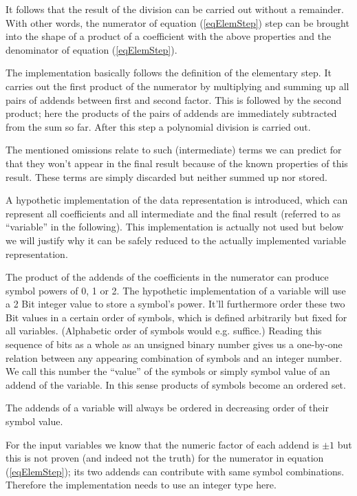 It follows that the result of the division can be carried out without a
remainder. With other words, the numerator of equation (\ref{eqElemStep})
step can be brought into the shape of a product of a coefficient with the
above properties and the denominator of equation (\ref{eqElemStep}).

The implementation basically follows the definition of the elementary
step. It carries out the first product of the numerator by multiplying and
summing up all pairs of addends between first and second factor. This is
followed by the second product; here the products of the pairs of addends
are immediately subtracted from the sum so far. After this step a
polynomial division is carried out.

The mentioned omissions relate to such (intermediate) terms we can predict
for that they won't appear in the final result because of the known
properties of this result. These terms are simply discarded but neither
summed up nor stored.

A hypothetic implementation of the data representation is introduced,
which can represent all coefficients and all intermediate and the final
result (referred to as ``variable'' in the following). This implementation
is actually not used but below we will justify why it can be safely
reduced to the actually implemented variable representation.

The product of the addends of the coefficients in the numerator can
produce symbol powers of 0, 1 or 2. The hypothetic implementation of a
variable will use a 2 Bit integer value to store a symbol's power. It'll
furthermore order these two Bit values in a certain order of symbols,
which is defined arbitrarily but fixed for all variables. (Alphabetic
order of symbols would e.g. suffice.) Reading this sequence of bits as a
whole as an unsigned binary number gives us a one-by-one relation between
any appearing combination of symbols and an integer number. We call this
number the ``value'' of the symbols or simply symbol value of an addend of
the variable. In this sense products of symbols become an ordered set.

The addends of a variable will always be ordered in decreasing order of
their symbol value.

For the input variables we know that the numeric factor of each addend is
$\pm 1$ but this is not proven (and indeed not the truth) for the
numerator in equation (\ref{eqElemStep}); its two addends can contribute
with same symbol combinations. Therefore the implementation needs to use
an integer type here.

